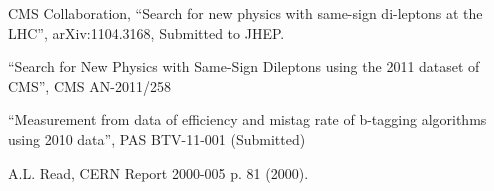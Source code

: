 \begin{thebibliography}{99}

 {CMS Collaboration, ``Search for new physics with same-sign di-leptons at the LHC''}, arXiv:1104.3168, Submitted to JHEP.

 {``Search for New Physics with Same-Sign Dileptons using the 2011 dataset of CMS''}, CMS AN-2011/258

 {``Measurement from data of efficiency and mistag rate of b-tagging algorithms using 2010 data''}, PAS BTV-11-001 (Submitted)

 {A.L. Read, CERN Report 2000-005 p. 81 (2000).}

\end{thebibliography}








